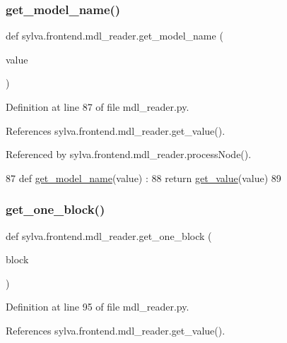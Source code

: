 \subsubsection{\texorpdfstring{get\+\_\+model\+\_\+name()}{get\_model\_name()}}
{\footnotesize\ttfamily def sylva.\+frontend.\+mdl\+\_\+reader.\+get\+\_\+model\+\_\+name (\begin{DoxyParamCaption}\item[{}]{value }\end{DoxyParamCaption})}



Definition at line 87 of file mdl\+\_\+reader.\+py.



References sylva.\+frontend.\+mdl\+\_\+reader.\+get\+\_\+value().



Referenced by sylva.\+frontend.\+mdl\+\_\+reader.\+process\+Node().


\begin{DoxyCode}
87   \textcolor{keyword}{def }\hyperlink{namespacesylva_1_1frontend_1_1mdl__reader_a078c8f3a089b8fd85e32051e6cdb1881}{get\_model\_name}(value) :
88     \textcolor{keywordflow}{return} \hyperlink{namespacesylva_1_1frontend_1_1mdl__reader_a1109464081a5fe17543fc36a494625bd}{get\_value}(value)
89 
\end{DoxyCode}
\mbox{\label{namespacesylva_1_1frontend_1_1mdl__reader_a64abdaaea51955fecbf3c5557ff78edc}} 
\subsubsection{\texorpdfstring{get\+\_\+one\+\_\+block()}{get\_one\_block()}}
{\footnotesize\ttfamily def sylva.\+frontend.\+mdl\+\_\+reader.\+get\+\_\+one\+\_\+block (\begin{DoxyParamCaption}\item[{}]{block }\end{DoxyParamCaption})}



Definition at line 95 of file mdl\+\_\+reader.\+py.



References sylva.\+frontend.\+mdl\+\_\+reader.\+get\+\_\+value().



